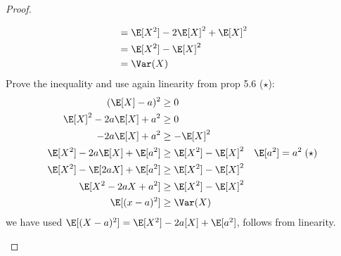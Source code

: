 \begin{proof}
\begin{enumerate}
\begin{align*}
				&= \E[X^2] - 2\E[X]^2 +\E[X]^2\\
				&= \E[X^2] - \E[X]^2\\
				&= \Var(X)
			\end{align*}
			Prove the inequality and use again linearity from prop 5.6 ($\star$):
			\begin{align*}
				(\E[X] - a)^2 &\ge 0 \\
				\E[X]^2 - 2a\E[X] + a^2 &\ge 0\\
				-2a \E[X] + a^2 &\ge - \E[X]^2 \\
				\E[X^2] - 2a\E[X] + \E[a^2] &\ge \E[X^2] - \E[X]^2 \quad \E[a^2] = a^2 \;(\star)\\
				\E[X^2] - \E[2aX] + \E[a^2] &\ge \E[X^2] - \E[X]^2\\
				\E[X^2-2aX+a^2] &\ge \E[X^2] - \E[X]^2\\
				\E[(x-a)^2] &\ge \Var(X)\\
			\end{align*}
			we have used $\E[(X-a)^2] = \E[X^2] - 2a[X] + \E[a^2]$, follows from linearity.
	\end{enumerate}
\end{proof}

